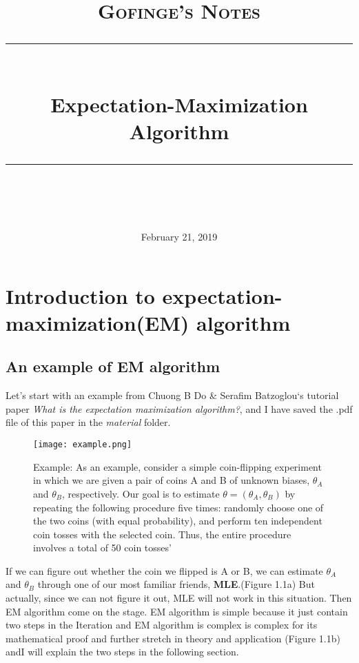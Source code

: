\documentclass[11pt]{scrartcl} %
\title{	
	\normalfont\normalsize
	\textsc{Gofinge's Notes}\\ %
	\vspace{25pt} %
	\rule{\linewidth}{0.5pt}\\ %
	\vspace{20pt} %
	{\huge Expectation-Maximization Algorithm}\\ %
	\vspace{12pt} %
	\rule{\linewidth}{2pt}\\ %
}
\date{\normalsize February 21, 2019} %
\begin{document}
\maketitle %


\section{Introduction to expectation-maximization(EM)  algorithm}

\subsection{An example of EM algorithm}

Let's start with an example from Chuong B Do \& Serafim Batzoglou‘s tutorial paper \textit{What is the expectation maximization algorithm?}, and I have saved the .pdf file of this paper in the \textit{material} folder.

\begin{figure}[h] %
	\centering
	\texttt{[image: example.png]} %
	\caption{Example: As an example, consider a simple coin-flipping experiment in which we are given a pair of coins A and B of unknown biases, $\theta_A$ and $\theta_B$, respectively. Our goal is to estimate $\theta = (\theta_A, \theta_B)$ by repeating the following procedure five times: randomly choose one of the two coins (with equal probability), and perform ten independent coin tosses with the selected coin. Thus, the entire procedure involves a total of 50 coin tosses'}
\end{figure}

If we can figure out whether the coin we flipped is A or B, we can estimate $\theta_A$ and $\theta_B$ through one of our most familiar friends, \textbf{MLE}.(Figure 1.1a) But actually, since we can not figure it out, MLE will not work in this situation. Then EM algorithm come on the stage. EM algorithm is simple because it just contain two steps in the Iteration and EM algorithm is complex is complex for its mathematical proof and further stretch in theory and application (Figure 1.1b) andI will explain the two steps in the following section.
\end{document}
